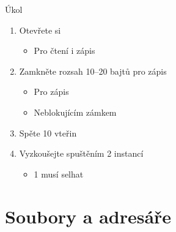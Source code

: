 \begin{frame}{Úkol}

  \begin{enumerate}
    \item Otevřete si 
    \begin{itemize}
      \item Pro čtení i zápis
    \end{itemize}

    \item Zamkněte rozsah 10--20 bajtů pro zápis
    \begin{itemize}
      \item Pro zápis
      \item Neblokujícím zámkem
    \end{itemize}

    \item Spěte 10 vteřin
    \item Vyzkoušejte spuštěním 2 instancí
    \begin{itemize}
      \item 1 musí selhat
    \end{itemize}
  \end{enumerate}

\end{frame}

\section{Soubory a adresáře}
\frame{\sectionpage}

